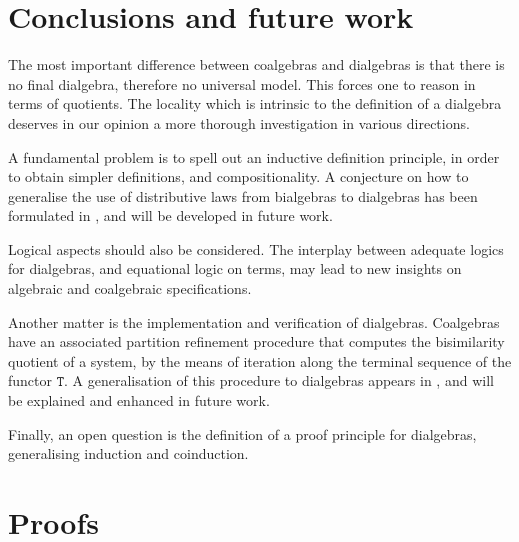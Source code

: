\documentclass[orivec]{llncs}
\newcommand{\mF}[1]{\mathtt{#1}}
\newcommand{\T}{\mF{T}}
\begin{document}
\noindent 









\section{Conclusions and future work}

The most important difference between coalgebras and dialgebras is that there is no final dialgebra, therefore no universal model. This forces one to reason in terms of quotients. The locality which is intrinsic to the definition of a dialgebra deserves in our opinion a more thorough investigation in various directions.

A fundamental problem is to spell out an inductive definition principle, in order to obtain simpler definitions, and compositionality. A conjecture on how to generalise the use of distributive laws \cite{tp97} from bialgebras to dialgebras has been formulated in \cite{Blo12}, and will be developed in future work.  

Logical aspects should also be considered. The interplay between adequate logics for dialgebras, and equational logic on terms, may lead to new insights on algebraic and coalgebraic specifications. 

Another matter is the implementation and verification of dialgebras. Coalgebras have an associated partition refinement procedure that computes the bisimilarity quotient of a system, by the means of iteration along the terminal sequence of the functor $\T$. A generalisation of this procedure to dialgebras appears in \cite{Blo12}, and will be explained and enhanced in future work.

Finally, an open question is the definition of a proof principle for dialgebras, generalising induction and coinduction.


\small{\vskip -20pt }

\appendix

\section{Proofs}
\end{document}
